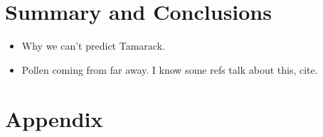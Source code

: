 \documentclass[12pt]{article}
\begin{document}
\section{Summary and Conclusions}


\begin{itemize}
\item Why we can't predict Tamarack.
\item Pollen coming from far away. I know some refs talk about this, cite.
\end{itemize}




\appendix
\section{Appendix}
\label{append}


\newpage

\end{document}
